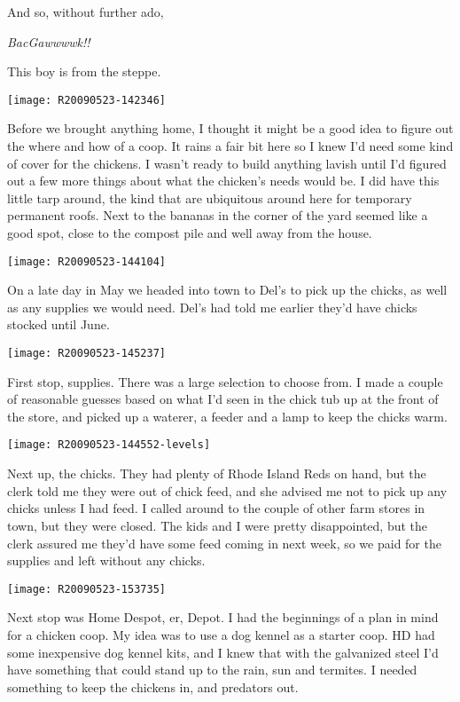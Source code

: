 And so, without further ado, 

{\Large {\em BacGawwwwk!!}}
\newpage

\vspace*{3in}
\begin{center}
\Huge{This boy is from the steppe.}
\end{center}
\newpage

\pagestyle{plain}

\texttt{[image: R20090523-142346]}

Before we brought anything home, I thought it might be a good idea to
figure out the where and how of a coop. It rains a fair bit here so I
knew I'd need some kind of cover for the chickens. I wasn't ready to
build anything lavish until I'd figured out a few more things about what
the chicken's needs would be. I did have this little tarp around, the
kind that are ubiquitous around here for temporary permanent roofs. Next
to the bananas in the corner of the yard seemed like a good spot, close
to the compost pile and well away from the house. 
\newpage

\texttt{[image: R20090523-144104]}

On a late day in May we headed into town to Del's to pick up the chicks,
as well as any supplies we would need.  Del's had told me earlier they'd
have chicks stocked until June. 
\newpage

\texttt{[image: R20090523-145237]}

First stop, supplies.  There was a large selection to choose from.  I
made a couple of reasonable guesses based on what I'd seen in the chick
tub up at the front of the store, and picked up a waterer, a feeder and
a lamp to keep the chicks warm. 
\newpage

\texttt{[image: R20090523-144552-levels]}

Next up, the chicks.  They had plenty of Rhode Island Reds on hand, but
the clerk told me they were out of chick feed, and she advised me not to
pick up any chicks unless I had feed.  I called around to the couple of
other farm stores in town, but they were closed.  The kids and I were
pretty disappointed, but the clerk assured me they'd have some feed
coming in next week, so we paid for the supplies and left without any
chicks. 
\newpage

\texttt{[image: R20090523-153735]}

Next stop was Home Despot, er, Depot.  I had the beginnings of a plan in
mind for a chicken coop.  My idea was to use a dog kennel as a starter
coop.  HD had some inexpensive dog kennel kits, and I knew that with the
galvanized steel I'd have something that could stand up to the rain, sun
and termites.  I needed something to keep the chickens in, and predators
out. 
\newpage

